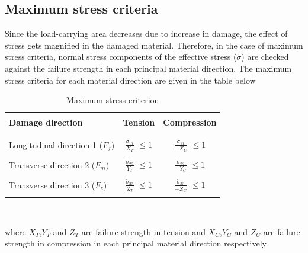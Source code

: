 \documentclass[12pt,a4paper,twoside,openright]{report}
\begin{document}
\subsection{Maximum stress criteria}\label{Maximum stress criteria}
\indent\indent\indent  Since the load-carrying area decreases due to increase in damage, the effect of stress gets magnified in the damaged material. Therefore, in the case of maximum stress criteria, normal stress components of the effective stress ($\tilde{\sigma}$) are checked against the failure strength in each principal material direction. The maximum stress criteria \citep{jiang2018evaluations} for each material direction are given in the table below 
\begin{table}[htbp]
  \begin{center}
     \begin{tabular}{l  c  c} 
     \hline
     \\
      \textbf{Damage direction} \;\;& \textbf{Tension} \;& \textbf{Compression}\\
      \\
      \hline
      \\
      Longitudinal direction 1 ($F_{f}$) & \Large{$\frac{\tilde{\sigma}_{11}}{X_{T}} $}\small{ $\leq 1$} & \Large{$\frac{\tilde{\sigma}_{11}}{-X_{C}} $}\small{ $\leq 1$} \\
      \\
      Transverse direction 2 ($F_{m}$)  &  \Large{$\frac{\tilde{\sigma}_{22}}{Y_{T}} $}\small{ $\leq 1$}  & \Large{$\frac{\tilde{\sigma}_{22}}{-Y_{C}} $}\small{ $\leq 1$}\\
      \\
      Transverse direction 3 ($F_{z}$) &  \Large{$\frac{\tilde{\sigma}_{33}}{Z_{T}} $}\small{ $\leq 1$}  &   \Large{$\frac{\tilde{\sigma}_{33}}{-Z_{C}} $}\small{ $\leq 1$}\\
       \\
       \hline
    \end{tabular}
    \\
    \caption{Maximum stress criterion}
    \label{tab:Maximum stress criterion}
  \end{center}
\end{table}
\FloatBarrier
where $X_{T}$,$ Y_{T} $ and $Z_{T}$ are failure strength in tension and $X_{C}$,$ Y_{C} $ and $Z_{C}$ are failure strength in compression in each principal material direction respectively.
\end{document}
